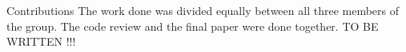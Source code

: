 \begin{projsection}{Contributions}
	The work done was divided equally between all three members of the group. The code review and the final paper were done together.
	TO BE WRITTEN !!!
\end{projsection}

